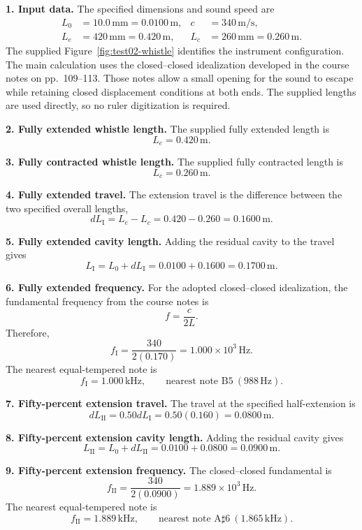 \textbf{1. Input data.} The specified dimensions and sound speed are
\[
\boxed{\begin{aligned}
L_{0}&=10.0\,\mathrm{mm}=0.0100\,\mathrm{m},&
c&=340\,\mathrm{m/s},\\
L_{e}&=420\,\mathrm{mm}=0.420\,\mathrm{m},&
L_{c}&=260\,\mathrm{mm}=0.260\,\mathrm{m}.
\end{aligned}}
\]
The supplied Figure~\ref{fig:test02-whistle} identifies the instrument configuration. The main calculation uses the closed--closed idealization developed in the course notes on pp.~109--113. Those notes allow a small opening for the sound to escape while retaining closed displacement conditions at both ends. The supplied lengths are used directly, so no ruler digitization is required.

\textbf{2. Fully extended whistle length.} The supplied fully extended length is
\[
\boxed{L_{e}=0.420\,\mathrm{m}.}
\]

\textbf{3. Fully contracted whistle length.} The supplied fully contracted length is
\[
\boxed{L_{c}=0.260\,\mathrm{m}.}
\]

\textbf{4. Fully extended travel.} The extension travel is the difference between the two specified overall lengths,
\[
\boxed{dL_{\mathrm{I}}=L_{e}-L_{c}=0.420-0.260=0.1600\,\mathrm{m}.}
\]

\textbf{5. Fully extended cavity length.} Adding the residual cavity to the travel gives
\[
\boxed{L_{\mathrm{I}}=L_{0}+dL_{\mathrm{I}}=0.0100+0.1600=0.1700\,\mathrm{m}.}
\]

\textbf{6. Fully extended frequency.} For the adopted closed--closed idealization, the fundamental frequency from the course notes is
\[
f=\frac{c}{2L}.
\]
Therefore,
\[
f_{\mathrm{I}}=\frac{340}{2(0.170)}=1.000\times10^{3}\,\mathrm{Hz}.
\]
The nearest equal-tempered note is
\[
\boxed{f_{\mathrm{I}}=1.000\,\mathrm{kHz},\qquad \text{nearest note }\mathrm{B5}\ (988\,\mathrm{Hz}).}
\]

\textbf{7. Fifty-percent extension travel.} The travel at the specified half-extension is
\[
\boxed{dL_{\mathrm{II}}=0.50dL_{\mathrm{I}}=0.50(0.160)=0.0800\,\mathrm{m}.}
\]

\textbf{8. Fifty-percent extension cavity length.} Adding the residual cavity gives
\[
\boxed{L_{\mathrm{II}}=L_{0}+dL_{\mathrm{II}}=0.0100+0.0800=0.0900\,\mathrm{m}.}
\]

\textbf{9. Fifty-percent extension frequency.} The closed--closed fundamental is
\[
f_{\mathrm{II}}=\frac{340}{2(0.0900)}=1.889\times10^{3}\,\mathrm{Hz}.
\]
The nearest equal-tempered note is
\[
\boxed{f_{\mathrm{II}}=1.889\,\mathrm{kHz},\qquad \text{nearest note }\mathrm{A\sharp6}\ (1.865\,\mathrm{kHz}).}
\]

